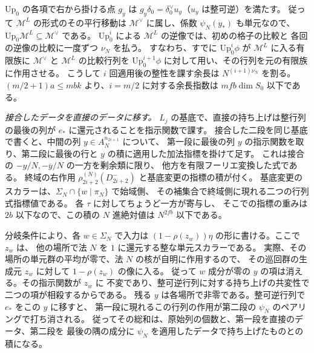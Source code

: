 \(\mathrm{Up}_0\) の各項で右から掛ける点 \(g_y\) は
\(g_y\delta_0=\delta_0^\vee u_y\)（\(u_y\) は整可逆）を満たす。
従って \(\mathscr M^L\) の形式のその平行移動は
\(\mathscr M^\vee\) に属し、係数 \(\psi_N(y_*)\) も単元なので、
\(\mathrm{Up}_0\mathscr M^L\subseteq\mathscr M^\vee\) である。
\(\mathrm{Up}_0^i\) による \(\mathscr M^L\) の逆像では、初めの格子の比較と
各回の逆像の比較に一度ずつ \(\nu_N\) を払う。
すなわち、すでに \(\mathrm{Up}_0^i\phi\) が \(\mathscr M^L\) に入る有限族に
\(\mathscr M^\vee\) と \(\mathscr M^L\) の比較行列を
\(\mathrm{Up}_0^{i+1}\phi\) に対して用い、その行列を元の有限族に作用させる。
こうして \(i\) 回適用後の整性を課す余長は \(N^{(i+1)\nu_N}\) を割る。
\((m/2+1)a\le mbk\) より、\(i=m/2\) に対する余長指数は
\(mfb\dim S_0\) 以下である。

\emph{接合したデータを直接のデータに移す。}
\(L_j\) の基底で、直接の持ち上げは整行列の最後の列が
\(e_*\) に還元されることを指示関数で課す。
接合した二段を同じ基底で書くと、中間の列 \(y\in A_N^{n_{2i+1}}\) について、
第一段に最後の列 \(y\) の指示関数を取り、第二段に最後の行と \(y\)
の積に適用した加法指標を掛けて足す。
これは接合の \(-y/N,-\overline y/N\) の一方を剰余類に限り、
他方を有限フーリエ変換した式である。
終域の右作用 \(\rho_{2i+2}^{(N)}(D_{2i+2}^-)\) と基底変更の指標の積が付く。
基底変更のスカラーは、\(\Sigma_N\cap\{w\mid\pi_N\}\) で始域側、
その補集合で終域側に現れる二つの行列式指標値である。
各 \(\tau\) に対してちょうど一方が寄与し、
そこでの指標の重みは \(2b\) 以下なので、この積の \(N\) 進絶対値は
\(N^{2fb}\) 以下である。

分岐条件により、各 \(w\in\Sigma_N\) で入力は
\((1-\rho(z_w))\eta\) の形に書ける。ここで \(z_w\) は、
他の場所で法 \(N\) を \(1\) に還元する整な単元スカラーである。
実際、その場所の単元群の平均が零で、法 \(N\) の核が自明に作用するので、
その巡回群の生成元 \(z_w\) に対して \(1-\rho(z_w)\) の像に入る。
従って \(w\) 成分が零の \(y\) の項は消える。その指示関数が \(z_w\) に
不変であり、整可逆行列に対する持ち上げの共変性で二つの項が相殺するからである。
残る \(y\) は各場所で非零である。整可逆行列で \(e_*\) をこの \(y\) に移すと、
第一段に現れるこの行列の作用が第二段の \(\psi_N\) のペアリングで打ち消される。
従ってその総和は、原始列の個数と、第一段を直接のデータ、第二段を
最後の隅の成分に \(\psi_N\) を適用したデータで持ち上げたものとの積になる。

